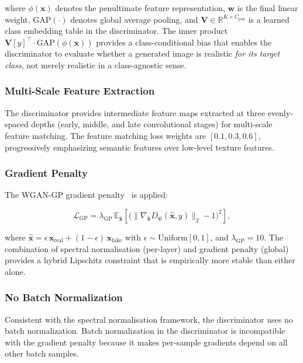 \documentclass[12pt,letterpaper]{article}
\newcommand{\bx}{\mathbf{x}}
\newcommand{\bw}{\mathbf{w}}
\newcommand{\bpsi}{\bm{\psi}}
\newcommand{\RR}{\mathbb{R}}
\newcommand{\EE}{\mathbb{E}}
\begin{document}
where $\phi(\bx)$ denotes the penultimate feature representation,
$\bw$ is the final linear weight, $\text{GAP}(\cdot)$ denotes global
average pooling, and $\mathbf{V} \in \RR^{K \times C_{\text{pen}}}$ is a
learned class embedding table in the discriminator.  The inner product
$\mathbf{V}[y]^\top \cdot \text{GAP}(\phi(\bx))$ provides a
class-conditional bias that enables the discriminator to evaluate whether
a generated image is realistic \emph{for its target class}, not merely
realistic in a class-agnostic sense.

\subsubsection{Multi-Scale Feature Extraction}

The discriminator provides intermediate feature maps extracted at three
evenly-spaced depths (early, middle, and late convolutional stages) for
multi-scale feature matching.  The feature matching loss weights are
$[0.1, 0.3, 0.6]$, progressively emphasizing semantic features over
low-level texture features.

\subsubsection{Gradient Penalty}

The WGAN-GP gradient penalty~\cite{gulrajani2017} is applied:

\begin{equation}
  \mathcal{L}_{\text{GP}} = \lambda_{\text{GP}}\,
    \EE_{\hat{\bx}}\!\left[
      \bigl(\|\nabla_{\hat{\bx}} D_{\bpsi}(\hat{\bx}, y)\|_2 - 1\bigr)^2
    \right],
  \label{eq:gp}
\end{equation}

where $\hat{\bx} = \epsilon\,\bx_{\text{real}} +
(1 - \epsilon)\,\bx_{\text{fake}}$ with $\epsilon \sim \text{Uniform}[0,1]$,
and $\lambda_{\text{GP}} = 10$.  The combination of spectral normalisation
(per-layer) and gradient penalty (global) provides a hybrid Lipschitz
constraint that is empirically more stable than either alone.

\subsubsection{No Batch Normalization}

Consistent with the spectral normalisation framework, the discriminator uses
no batch normalization.  Batch normalization in the discriminator is
incompatible with the gradient penalty because it makes per-sample gradients
depend on all other batch samples.
\end{document}
